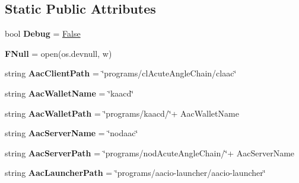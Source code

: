 \subsection*{Static Public Attributes}
\begin{DoxyCompactItemize}
\item 
\mbox{\label{classtest_utils_1_1_utils_a44dfc3a8d0a9a31ba6dff9d30a11e26a}} 
bool {\bfseries Debug} = \mbox{\hyperlink{struct_false}{False}}
\item 
\mbox{\label{classtest_utils_1_1_utils_afe95aab5279c78c421206841506a71b1}} 
{\bfseries F\+Null} = open(os.\+devnull, \textquotesingle{}w\textquotesingle{})
\item 
\mbox{\label{classtest_utils_1_1_utils_a5a7d80de9493a28e1b8c90b579bd0ad1}} 
string {\bfseries Aac\+Client\+Path} = \char`\"{}programs/cl\+Acute\+Angle\+Chain/claac\char`\"{}
\item 
\mbox{\label{classtest_utils_1_1_utils_af02d532405842cf14f265dd62fbe9f12}} 
string {\bfseries Aac\+Wallet\+Name} = \char`\"{}kaacd\char`\"{}
\item 
\mbox{\label{classtest_utils_1_1_utils_ae3e544b57375449296ee43be3a9bdfe7}} 
string {\bfseries Aac\+Wallet\+Path} = \char`\"{}programs/kaacd/\char`\"{}+ Aac\+Wallet\+Name
\item 
\mbox{\label{classtest_utils_1_1_utils_a44ad467d83d289a80b4c1c37f820ac36}} 
string {\bfseries Aac\+Server\+Name} = \char`\"{}nodaac\char`\"{}
\item 
\mbox{\label{classtest_utils_1_1_utils_a30c50536975ad03bfccc66a44cada61c}} 
string {\bfseries Aac\+Server\+Path} = \char`\"{}programs/nod\+Acute\+Angle\+Chain/\char`\"{}+ Aac\+Server\+Name
\item 
\mbox{\label{classtest_utils_1_1_utils_addb50f10f9aa372415bcb41d64660e13}} 
string {\bfseries Aac\+Launcher\+Path} = \char`\"{}programs/aacio-\/launcher/aacio-\/launcher\char`\"{}
\item 
\mbox{\label{classtest_utils_1_1_utils_a48ec249795804b70fb0a38937e7e8f3d}} 

\end{DoxyCompactItemize}
